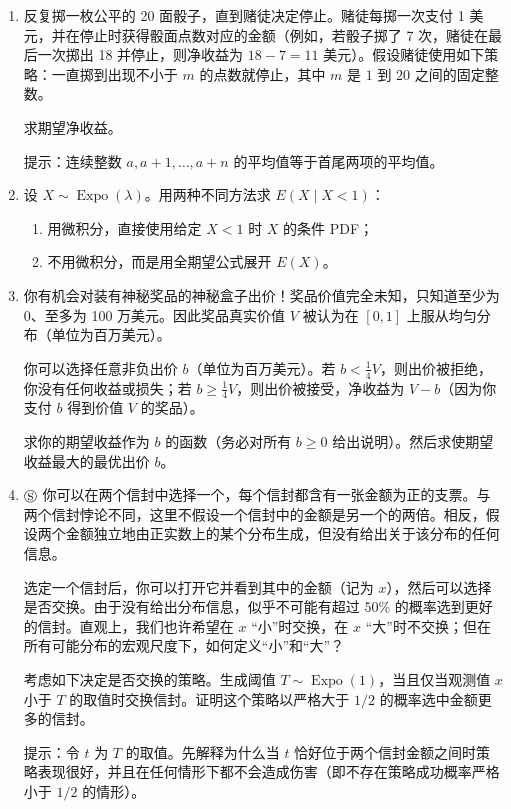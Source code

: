 \documentclass[UTF8,12pt,a4paper,fontset=fandol]{ctexart}
\begin{document}
\begin{enumerate}
  \item 反复掷一枚公平的 20 面骰子，直到赌徒决定停止。赌徒每掷一次支付 1 美元，并在停止时获得骰面点数对应的金额（例如，若骰子掷了 7 次，赌徒在最后一次掷出 18 并停止，则净收益为 $18-7=11$ 美元）。假设赌徒使用如下策略：一直掷到出现不小于 $m$ 的点数就停止，其中 $m$ 是 $1$ 到 $20$ 之间的固定整数。

  求期望净收益。

  \noindent 提示：连续整数 $a,a+1,\ldots,a+n$ 的平均值等于首尾两项的平均值。

  \item 设 $X\sim\operatorname{Expo}(\lambda)$。用两种不同方法求 $E(X\mid X<1)$：
  \begin{enumerate}
    \item[(a)] 用微积分，直接使用给定 $X<1$ 时 $X$ 的条件 PDF；
    \item[(b)] 不用微积分，而是用全期望公式展开 $E(X)$。
  \end{enumerate}

  \item 你有机会对装有神秘奖品的神秘盒子出价！奖品价值完全未知，只知道至少为 0、至多为 100 万美元。因此奖品真实价值 $V$ 被认为在 $[0,1]$ 上服从均匀分布（单位为百万美元）。

  你可以选择任意非负出价 $b$（单位为百万美元）。若 $b<\frac14V$，则出价被拒绝，你没有任何收益或损失；若 $b\ge\frac14V$，则出价被接受，净收益为 $V-b$（因为你支付 $b$ 得到价值 $V$ 的奖品）。

  求你的期望收益作为 $b$ 的函数（务必对所有 $b\ge0$ 给出说明）。然后求使期望收益最大的最优出价 $b$。

  \item $\circledS$ 你可以在两个信封中选择一个，每个信封都含有一张金额为正的支票。与两个信封悖论不同，这里不假设一个信封中的金额是另一个的两倍。相反，假设两个金额独立地由正实数上的某个分布生成，但没有给出关于该分布的任何信息。

  选定一个信封后，你可以打开它并看到其中的金额（记为 $x$），然后可以选择是否交换。由于没有给出分布信息，似乎不可能有超过 $50\%$ 的概率选到更好的信封。直观上，我们也许希望在 $x$ “小”时交换，在 $x$ “大”时不交换；但在所有可能分布的宏观尺度下，如何定义“小”和“大”？

  考虑如下决定是否交换的策略。生成阈值 $T\sim\operatorname{Expo}(1)$，当且仅当观测值 $x$ 小于 $T$ 的取值时交换信封。证明这个策略以严格大于 $1/2$ 的概率选中金额更多的信封。

  \noindent 提示：令 $t$ 为 $T$ 的取值。先解释为什么当 $t$ 恰好位于两个信封金额之间时策略表现很好，并且在任何情形下都不会造成伤害（即不存在策略成功概率严格小于 $1/2$ 的情形）。


\end{enumerate}
\end{document}
